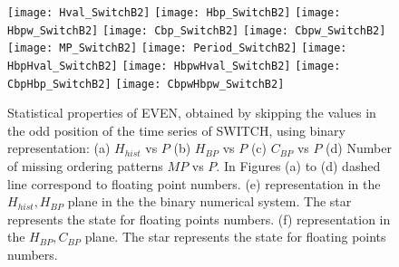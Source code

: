 
\begin{figure}
	\texttt{[image: Hval\_SwitchB2]}
	\texttt{[image: Hbp\_SwitchB2]}
	\texttt{[image: Hbpw\_SwitchB2]}
	\texttt{[image: Cbp\_SwitchB2]}
	\texttt{[image: Cbpw\_SwitchB2]}
	\texttt{[image: MP\_SwitchB2]}
	\texttt{[image: Period\_SwitchB2]}
	\texttt{[image: HbpHval\_SwitchB2]}
	\texttt{[image: HbpwHval\_SwitchB2]}
	\texttt{[image: CbpHbp\_SwitchB2]}
	\texttt{[image: CbpwHbpw\_SwitchB2]}
	\caption{Statistical properties of EVEN, obtained by skipping the values in the odd position of the time series of  SWITCH,  using binary representation: (a) $H_{hist}$ vs $P$ (b) $H_{BP}$ vs $P$ (c) $C_{BP}$ vs $P$ (d) Number of missing ordering patterns $MP$ vs $P$. In Figures (a) to (d) dashed line correspond to floating point numbers. (e) representation in the $H_{hist},H_{BP}$ plane in the the binary numerical system.  The star represents the state for floating points numbers. (f) representation in the $H_{BP},C_{BP}$ plane.  The star represents the state for floating points numbers.  } \label{fig:seqparbin}
\end{figure}


